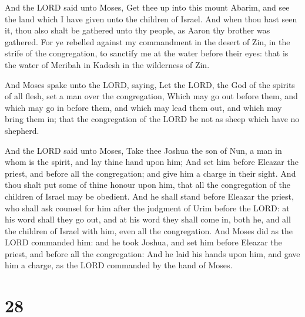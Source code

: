  And the LORD said unto Moses, Get thee up into this
mount Abarim, and see the land which I have given unto the children of
Israel.  And when thou hast seen it, thou also shalt be
gathered unto thy people, as Aaron thy brother was gathered.
 For ye rebelled against my commandment in the desert of
Zin, in the strife of the congregation, to sanctify me at the water
before their eyes: that is the water of Meribah in Kadesh in the
wilderness of Zin.

 And Moses spake unto the LORD, saying,  Let
the LORD, the God of the spirits of all flesh, set a man over the
congregation,  Which may go out before them, and which may
go in before them, and which may lead them out, and which may bring them
in; that the congregation of the LORD be not as sheep which have no
shepherd.

 And the LORD said unto Moses, Take thee Joshua the son
of Nun, a man in whom is the spirit, and lay thine hand upon him;
 And set him before Eleazar the priest, and before all the
congregation; and give him a charge in their sight.  And
thou shalt put some of thine honour upon him, that all the congregation
of the children of Israel may be obedient.  And he shall
stand before Eleazar the priest, who shall ask counsel for him after the
judgment of Urim before the LORD: at his word shall they go out, and at
his word they shall come in, both he, and all the children of Israel
with him, even all the congregation.  And Moses did as the
LORD commanded him: and he took Joshua, and set him before Eleazar the
priest, and before all the congregation:  And he laid his
hands upon him, and gave him a charge, as the LORD commanded by the hand
of Moses.

\hypertarget{section-27}{%
\section{28}\label{section-27}}

